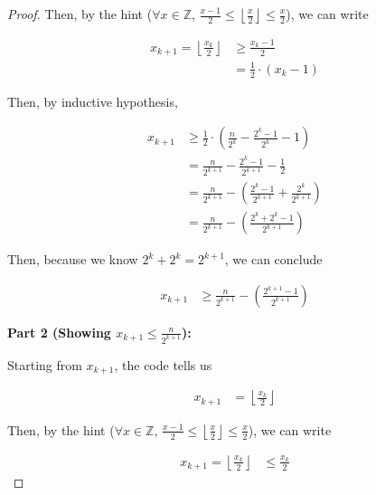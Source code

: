 \documentclass[12pt]{article}
\begin{document}
\begin{enumerate}[a.]
\begin{proof}
        \bigskip

        Then, by the hint ($\forall x \in \mathbb{Z}$,
        $\frac{x-1}{2} \leq \left\lfloor \frac{x}{2} \right\rfloor \leq \frac{x}{2}$),
        we can write

        \begin{align}
            x_{k+1} = \left\lfloor \frac{x_k}{2} \right\rfloor &\geq \frac{x_k - 1}{2}\\
            &= \frac{1}{2} \cdot (x_k - 1)
        \end{align}

        \bigskip

        Then, by inductive hypothesis,

        \begin{align}
            x_{k+1} &\geq \frac{1}{2} \cdot \left( \frac{n}{2^k} - \frac{2^k - 1}{2^k} - 1 \right)\\
            &= \frac{n}{2^{k+1}} - \frac{2^k-1}{2^{k+1}} - \frac{1}{2}\\
            &= \frac{n}{2^{k+1}} - \left( \frac{2^k - 1}{2^{k+1}} + \frac{2^k}{2^{k+1}} \right)\\
            &= \frac{n}{2^{k+1}} - \left( \frac{2^k + 2^k - 1}{2^{k+1}} \right)
        \end{align}

        \bigskip

        Then, because we know $2^k + 2^k = 2^{k+1}$, we can conclude

        \begin{align}
            x_{k+1} &\geq \frac{n}{2^{k+1}} - \left( \frac{2^{k+1}-1}{2^{k+1}} \right)
        \end{align}

        \textbf{Part 2 (Showing $x_{k+1} \leq \frac{n}{2^{k+1}}$):}

        \bigskip

        Starting from $x_{k+1}$, the code tells us

        \begin{align}
            x_{k+1} &= \left\lfloor \frac{x_k}{2} \right\rfloor
        \end{align}

        \bigskip

        Then, by the hint ($\forall x \in \mathbb{Z}$, $\frac{x-1}{2} \leq
        \left\lfloor \frac{x}{2} \right\rfloor \leq \frac{x}{2}$), we can write

        \begin{align}
            x_{k+1} = \left\lfloor \frac{x_k}{2} \right\rfloor &\leq \frac{x_k}{2}
        \end{align}


\end{proof}
\end{enumerate}
\end{document}

